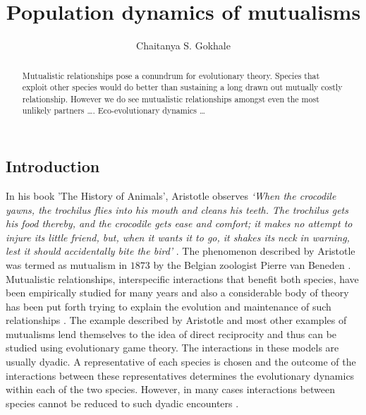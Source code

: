 \documentclass{pnastwo}
\begin{document}
\title{Population dynamics of mutualisms}

 \author{Chaitanya S. Gokhale}


\maketitle

\begin{article}

\begin{abstract}
Mutualistic relationships pose a conundrum for evolutionary theory.
Species that exploit other species would do better than sustaining a long drawn out mutually costly relationship. However we do see mutualistic relationships amongst even the most unlikely partners \ldots.
Eco-evolutionary dynamics \ldots
\end{abstract}



\section{Introduction}

In his book 'The History of Animals', Aristotle observes
{\em
`When the crocodile yawns, the trochilus flies into his mouth and cleans
his teeth. The trochilus gets his food thereby, and the crocodile
gets ease and comfort; it makes no attempt to injure its little friend,
but, when it wants it to go, it shakes its neck in warning, lest it
should accidentally bite the bird'} \cite{aristotle:350bc}.
The phenomenon described by Aristotle was termed as mutualism in $1873$ by the Belgian zoologist Pierre van Beneden \cite{bronstein:book:2003}.
Mutualistic relationships, interspecific interactions that benefit both species, have been empirically studied for many years 
\cite{boucher:book:1985,hinton:PTENHS:1951,wilson:AmNat:1983,bronstein:QRB:1994,pierce:ARE:2002,kiers:Nature:2003,bshary:ASB:2004} and also a considerable body of theory has been put forth trying to explain the evolution and maintenance of such relationships \cite{poulin:JTB:1995,doebeli:PNAS:1998,noe:book:2001,johnstone:ECL:2002,bergstrom:PNAS:2003,hoeksema:AmNat:2003,akcay:PRSB:2007,bshary:Nature:2008}.
The example described by Aristotle and most other examples of mutualisms lend themselves to the idea of direct reciprocity \cite{trivers:QRB:1971} and thus can be studied using evolutionary game theory.
The interactions in these models are usually dyadic.
A representative of each species is chosen and the outcome of the interactions between these representatives 
determines the evolutionary dynamics within each of the two species.
However, in many cases interactions between species cannot be reduced to such dyadic encounters \cite{stadler:book:2008}.


\end{article}
\end{document}
